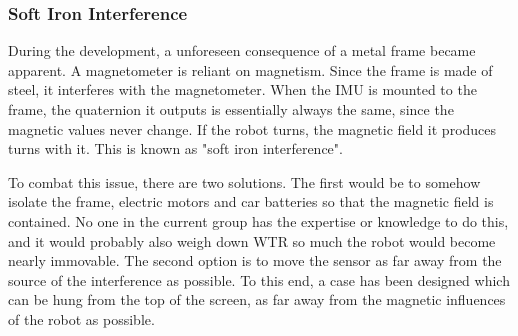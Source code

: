 \subsubsection{Soft Iron Interference}
During the development, a unforeseen consequence of a metal frame became apparent.
A magnetometer is reliant on magnetism.
Since the frame is made of steel, it interferes with the magnetometer.
When the IMU is mounted to the frame, the quaternion it outputs is essentially always the same, since the magnetic values never change.
If the robot turns, the magnetic field it produces turns with it.
This is known as "soft iron interference".

To combat this issue, there are two solutions.
The first would be to somehow isolate the frame, electric motors and car batteries so that the magnetic field is contained.
No one in the current group has the expertise or knowledge to do this, and it would probably also weigh down WTR so much the robot would become nearly immovable.
The second option is to move the sensor as far away from the source of the interference as possible.
To this end, a case has been designed which can be hung from the top of the screen, as far away from the magnetic influences of the robot as possible.
\newpage    
    